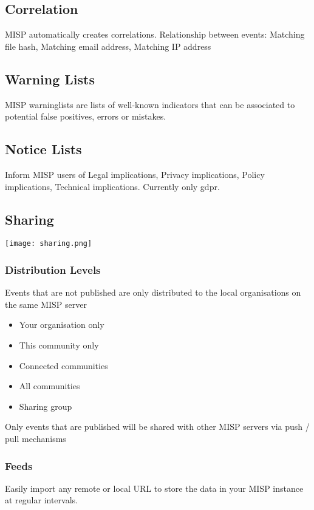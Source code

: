 \subsection{Correlation}
MISP automatically creates correlations. Relationship between events: Matching file hash, Matching email address, Matching IP address
\subsection{Warning Lists}
MISP warninglists are lists of well-known indicators that can be associated to potential false positives, errors or mistakes.
\subsection{Notice Lists}
Inform MISP users of Legal implications, Privacy implications, Policy implications, Technical implications.
Currently only gdpr.
\subsection{Sharing}
\texttt{[image: sharing.png]}
\subsubsection{Distribution Levels}
Events that are not published are only distributed to the local organisations on the same MISP server
\begin{itemize}
    \item Your organisation only
    \item This community only
    \item Connected communities
    \item All communities
    \item Sharing group
\end{itemize}
Only events that are published will be shared with other MISP servers via push / pull mechanisms
\subsubsection{Feeds}
Easily import any remote or local URL to store the data in your MISP instance at regular intervals.
